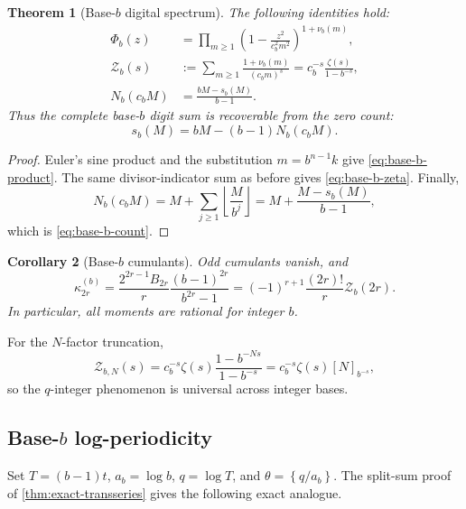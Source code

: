 \documentclass[11pt,oneside]{article}
\newtheorem{theorem}{Theorem}[section]
\newtheorem{corollary}[theorem]{Corollary}
\theoremstyle{definition}
\theoremstyle{remark}
\begin{document}
\begin{theorem}[Base-\(b\) digital spectrum]
\label{thm:base-b-spectrum}
The following identities hold:
\begin{align}
 \Phi_b(z)
 &=
 \prod_{m\geq1}
 \left(1-\frac{z^2}{c_b^2m^2}\right)^{1+\nu_b(m)},
 \label{eq:base-b-product}\\
 \mathcal Z_b(s)
 &:=
 \sum_{m\geq1}\frac{1+\nu_b(m)}{(c_bm)^s}
 =
 c_b^{-s}\frac{\zeta(s)}{1-b^{-s}},
 \label{eq:base-b-zeta}\\
 N_b(c_bM)
 &=
 \frac{bM-s_b(M)}{b-1}.
 \label{eq:base-b-count}
\end{align}
Thus the complete base-\(b\) digit sum is recoverable from the zero count:
\begin{equation}
 s_b(M)=bM-(b-1)N_b(c_bM).
 \label{eq:digit-recovery}
\end{equation}
\end{theorem}

\begin{proof}
Euler's sine product and the substitution \(m=b^{n-1}k\) give
\eqref{eq:base-b-product}.  The same divisor-indicator sum as before gives
\eqref{eq:base-b-zeta}.  Finally,
\[
 N_b(c_bM)
 =M+\sum_{j\geq1}\left\lfloor\frac M{b^j}\right\rfloor
 =M+\frac{M-s_b(M)}{b-1},
\]
which is \eqref{eq:base-b-count}.
\end{proof}

\begin{corollary}[Base-\(b\) cumulants]
Odd cumulants vanish, and
\begin{equation}
 \kappa_{2r}^{(b)}
 =
 \frac{2^{2r-1}B_{2r}}r
 \frac{(b-1)^{2r}}{b^{2r}-1}
 =
 (-1)^{r+1}\frac{(2r)!}{r}\mathcal Z_b(2r).
 \label{eq:base-b-cumulants}
\end{equation}
In particular, all moments are rational for integer \(b\).
\end{corollary}

For the \(N\)-factor truncation,
\begin{equation}
 \mathcal Z_{b,N}(s)
 =c_b^{-s}\zeta(s)
  \frac{1-b^{-Ns}}{1-b^{-s}}
 =c_b^{-s}\zeta(s)[N]_{b^{-s}},
 \label{eq:base-b-qinteger}
\end{equation}
so the \(q\)-integer phenomenon is universal across integer bases.

\subsection{Base-\(b\) log-periodicity}

Set \(T=(b-1)t\), \(a_b=\log b\), \(q=\log T\), and
\(\theta=\left\{q/a_b\right\}\).  The split-sum proof of
\cref{thm:exact-transseries} gives the following exact analogue.
\end{document}
